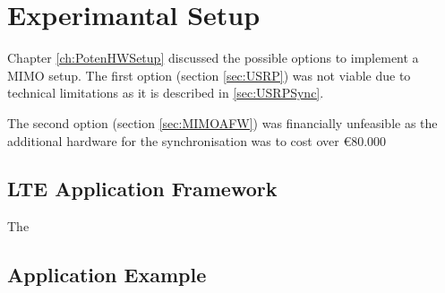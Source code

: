 \chapter{Experimantal Setup}
\label{ch:ExSetup}

Chapter \ref{ch:PotenHWSetup} discussed the possible options to implement a MIMO setup. The first option (section \ref{sec:USRP}) was not viable due to technical limitations as it is described in \ref{sec:USRPSync}.

The second option (section \ref{sec:MIMOAFW}) was financially unfeasible as the additional hardware for the synchronisation was to cost over €80.000

\section{LTE Application Framework}\label{sec:LTEAFW}
The 
\section{Application Example}\label{sec:AppEx}

